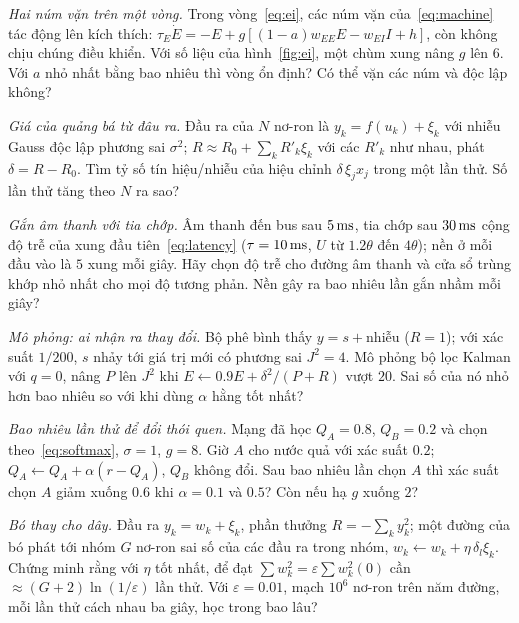 \begin{exercise}[\lvlB]
\label{ex:10:2}
\emph{Hai núm vặn trên một vòng.} Trong vòng~\eqref{eq:ei}, các núm vặn của~\eqref{eq:machine} tác động lên kích thích: $\tau_E\dot E=-E+g[(1-a)w_{EE}E-w_{EI}I+h]$, còn  không chịu chúng điều khiển. Với số liệu của hình~\ref{fig:ei}, một chùm xung  nâng $g$ lên $6$. Với $a$ nhỏ nhất bằng bao nhiêu thì vòng ổn định? Có thể vặn các núm  và  độc lập không?
\end{exercise}

\begin{exercise}[\lvlB]
\label{ex:10:3}
\emph{Giá của quảng bá từ đâu ra.} Đầu ra của $N$ nơ-ron là $y_k=f(u_k)+\xi_k$ với nhiễu Gauss độc lập phương sai $\sigma^2$; $R\approx R_0+\sum_kR'_k\xi_k$ với các $R'_k$ như nhau,  phát $\delta=R-R_0$. Tìm tỷ số tín hiệu/nhiễu của hiệu chỉnh $\delta\,\xi_jx_j$ trong một lần thử. Số lần thử tăng theo $N$ ra sao?
\end{exercise}

\begin{exercise}[\lvlB]
\label{ex:10:4}
\emph{Gắn âm thanh với tia chớp.} Âm thanh đến bus sau $5\,\text{ms}$, tia chớp sau $30\,\text{ms}$ cộng độ trễ của xung đầu tiên~\eqref{eq:latency} ($\tau=10\,\text{ms}$, $U$ từ $1.2\theta$ đến $4\theta$); nền ở mỗi đầu vào là $5$ xung mỗi giây. Hãy chọn độ trễ cho đường âm thanh và cửa sổ trùng khớp nhỏ nhất cho mọi độ tương phản. Nền gây ra bao nhiêu lần gắn nhầm mỗi giây?
\end{exercise}

\begin{exercise}[\lvlB]
\label{ex:10:5}
\emph{Mô phỏng: ai nhận ra thay đổi.} Bộ phê bình thấy $y=s+\text{nhiễu}$ ($R=1$); với xác suất $1/200$, $s$ nhảy tới giá trị mới có phương sai $J^2=4$. Mô phỏng bộ lọc Kalman với $q=0$, nâng $P$ lên $J^2$ khi $E\leftarrow0.9E+\delta^2/(P+R)$ vượt $20$. Sai số của nó nhỏ hơn bao nhiêu so với khi dùng $\alpha$ hằng tốt nhất?
\end{exercise}

\begin{exercise}[\lvlA]
\label{ex:10:6}
\emph{Bao nhiêu lần thử để đổi thói quen.} Mạng đã học $Q_A=0.8$, $Q_B=0.2$ và chọn theo~\eqref{eq:softmax}, $\sigma=1$, $g=8$. Giờ $A$ cho nước quả với xác suất $0.2$; $Q_A\leftarrow Q_A+\alpha(r-Q_A)$, $Q_B$ không đổi. Sau bao nhiêu lần chọn $A$ thì xác suất chọn $A$ giảm xuống $0.6$ khi $\alpha=0.1$ và $0.5$? Còn nếu  hạ $g$ xuống $2$?
\end{exercise}

\begin{exercise}[\lvlC]
\label{ex:10:7}
\emph{Bó thay cho dây.} Đầu ra $y_k=w_k+\xi_k$, phần thưởng $R=-\sum_ky_k^2$; một đường của bó phát tới nhóm $G$ nơ-ron sai số của các đầu ra trong nhóm, $w_k\leftarrow w_k+\eta\,\delta_l\xi_k$. Chứng minh rằng với $\eta$ tốt nhất, để đạt $\sum w_k^2=\varepsilon\sum w_k^2(0)$ cần $\approx(G+2)\ln(1/\varepsilon)$ lần thử. Với $\varepsilon=0.01$, mạch $10^6$ nơ-ron trên năm đường, mỗi lần thử cách nhau ba giây, học trong bao lâu?
\end{exercise}
